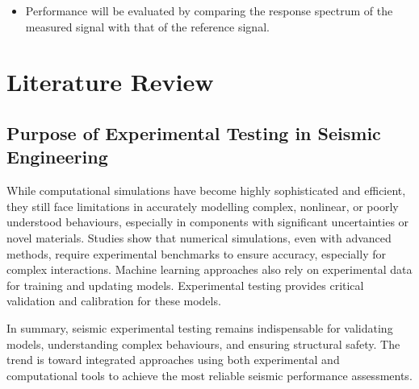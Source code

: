 \documentclass[10pt]{extarticle}
\begin{document}
\begin{itemize}
\begin{itemize}[label=$\diamond$]
    In damaged structures, damping can reach:
    \begin{itemize}
        \item $\xi_1 = 10\%$
        \item $\xi_2 = 25\%$
    \end{itemize}
    \end{itemize}

    \item Performance will be evaluated by comparing the response spectrum of the measured signal with that of the reference signal.
\end{itemize}


\section{Literature Review} %

\subsection{Purpose of Experimental Testing in Seismic Engineering} %
While computational simulations have become highly sophisticated and efficient, they still face limitations in accurately modelling complex, nonlinear, or poorly understood behaviours, especially in components with significant uncertainties or novel materials. 
Studies show that numerical simulations, even with advanced methods, require experimental benchmarks to ensure accuracy, especially for complex interactions. Machine learning approaches also rely on experimental data for training and updating models. Experimental testing provides critical validation and calibration for these models.

In summary, seismic experimental testing remains indispensable for validating models, understanding complex behaviours, and ensuring structural safety. The trend is toward integrated approaches using both experimental and computational tools to achieve the most reliable seismic performance assessments.\citep{williams2001,Zhang2023Experimentally,Liu2020Experimental,Bahraq2021Numerical,Malomo2022M-DEM,Qiu2024Seismic,Yavas2023A,Mokhtari2023A}
\end{document}
